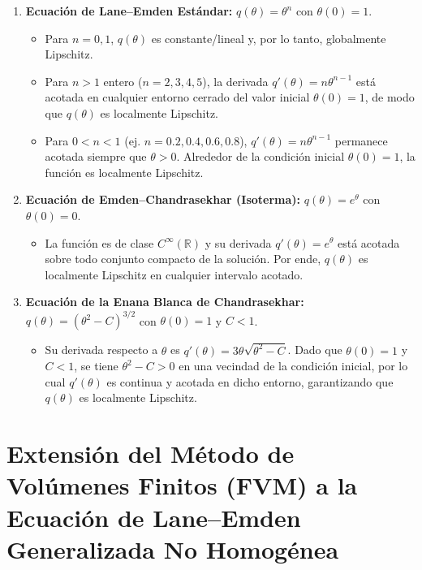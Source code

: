 \documentclass[12pt,a4paper]{article}
\begin{document}
\begin{enumerate}
    \item \textbf{Ecuación de Lane--Emden Estándar:} $q(\theta) = \theta^n$ con $\theta(0) = 1$.
    \begin{itemize}
        \item Para $n = 0, 1$, $q(\theta)$ es constante/lineal y, por lo tanto, globalmente Lipschitz.
        \item Para $n > 1$ entero ($n = 2, 3, 4, 5$), la derivada $q'(\theta) = n\theta^{n-1}$ está acotada en cualquier entorno cerrado del valor inicial $\theta(0) = 1$, de modo que $q(\theta)$ es localmente Lipschitz.
        \item Para $0 < n < 1$ (ej. $n = 0.2, 0.4, 0.6, 0.8$), $q'(\theta) = n\theta^{n-1}$ permanece acotada siempre que $\theta > 0$. Alrededor de la condición inicial $\theta(0) = 1$, la función es localmente Lipschitz.
    \end{itemize}

    \item \textbf{Ecuación de Emden--Chandrasekhar (Isoterma):} $q(\theta) = e^\theta$ con $\theta(0) = 0$.
    \begin{itemize}
        \item La función es de clase $C^\infty(\mathbb{R})$ y su derivada $q'(\theta) = e^\theta$ está acotada sobre todo conjunto compacto de la solución. Por ende, $q(\theta)$ es localmente Lipschitz en cualquier intervalo acotado.
    \end{itemize}

    \item \textbf{Ecuación de la Enana Blanca de Chandrasekhar:} $q(\theta) = (\theta^2 - C)^{3/2}$ con $\theta(0) = 1$ y $C < 1$.
    \begin{itemize}
        \item Su derivada respecto a $\theta$ es $q'(\theta) = 3\theta\sqrt{\theta^2 - C}$. Dado que $\theta(0) = 1$ y $C < 1$, se tiene $\theta^2 - C > 0$ en una vecindad de la condición inicial, por lo cual $q'(\theta)$ es continua y acotada en dicho entorno, garantizando que $q(\theta)$ es localmente Lipschitz.
    \end{itemize}
\end{enumerate}

\section{Extensión del Método de Volúmenes Finitos (FVM) a la Ecuación de Lane--Emden Generalizada No Homogénea}
\end{document}

